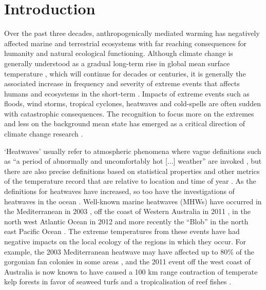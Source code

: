 \documentclass[a4paper,10pt,review]{elsarticle}
\begin{document}
\section{Introduction}
Over the past three decades, anthropogenically mediated warming has negatively affected marine and terrestrial ecosystems with far reaching consequences for humanity and natural ecological functioning. Although climate change is generally understood as a gradual long-term rise in global mean surface temperature \citep{IPCC2014}, which will continue for decades or centuries, it is generally the associated increase in frequency and severity of extreme events that affects humans and ecosystems in the short-term \citep{Easterling2000}. Impacts of extreme events such as floods, wind storms, tropical cyclones, heatwaves and cold-spells are often sudden with catastrophic consequences. The recognition to focus more on the extremes and less on the background mean state has emerged as a critical direction of climate change research \citep{Jentsch2007}.

`Heatwaves' usually refer to atmospheric phenomena where vague definitions such as ``a period of abnormally and uncomfortably hot [...] weather'' are invoked \citep{Glickman2000}, but there are also precise definitions based on statistical properties and other metrics of the temperature record that are relative to location and time of year \citep[e.g.][]{Meehl2004, Alexander2006, Fischer2010, Fischer2011, Perkins2013}. As the definitions for heatwaves have increased, so too have the investigations of heatwaves in the ocean \citep[e.g.][]{Mackenzie2007, Selig2010, Sura2011, Lima2012, DeCastro2014}. Well-known marine heatwaves (MHWs) have occurred in the Mediterranean in 2003 \citep{Black2004, Olita2007, Garrabou2009}, off the coast of Western Australia in 2011 \citep{Feng2013, Pearce2013, Wernberg2013}, in the north west Atlantic Ocean in 2012 \citep{Mills2012, Chen2014, Chen2015} and more recently the ``Blob'' in the north east Pacific Ocean \citep{Bond2015}. The extreme temperatures from these events have had negative impacts on the local ecology of the regions in which they occur. For example, the 2003 Mediterranean heatwave may have affected up to 80\% of the gorgonian fan colonies in some areas \citep{Garrabou2009}, and the 2011 event off the west coast of Australia is now known to have caused a 100 km range contraction of temperate kelp forests in favor of seaweed turfs and a tropicalisation of reef fishes \citep{Wernberg2016}.
\end{document}
